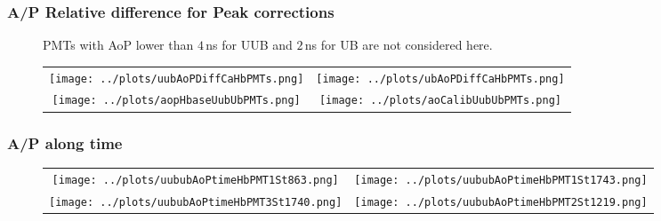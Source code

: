 \documentclass[aspectratio=169]{beamer}
\begin{document}
\begin{frame}
  \frametitle{A/P Relative difference for Peak corrections}
  \begin{figure}
    PMTs with AoP lower than $4$\,ns for UUB and $2$\,ns for UB are not considered here.
    \centering
    \begin{tabularx}{\textwidth}{CC}
      \texttt{[image: ../plots/uubAoPDiffCaHbPMTs.png]}
      &
      \texttt{[image: ../plots/ubAoPDiffCaHbPMTs.png]}
      \\
      \texttt{[image: ../plots/aopHbaseUubUbPMTs.png]}
      &
      \texttt{[image: ../plots/aoCalibUubUbPMTs.png]}
    \end{tabularx}
  \end{figure}
\end{frame}



\begin{frame}
  \frametitle{A/P along time}
  \begin{figure}
    \centering
    \begin{tabularx}{\textwidth}{CC}
      \texttt{[image: ../plots/uububAoPtimeHbPMT1St863.png]}
      &
      \texttt{[image: ../plots/uububAoPtimeHbPMT1St1743.png]}
      \\
      \texttt{[image: ../plots/uububAoPtimeHbPMT3St1740.png]}
      &
      \texttt{[image: ../plots/uububAoPtimeHbPMT2St1219.png]}
    \end{tabularx}
  \end{figure}
\end{frame}


%
\end{document}
